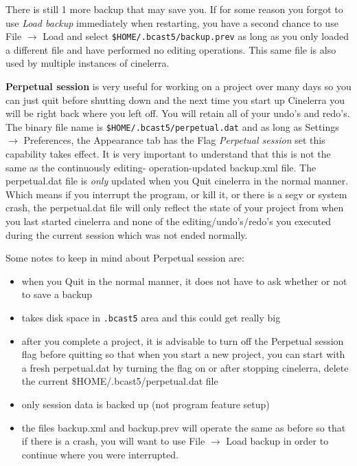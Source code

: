 There is still 1 more backup that may save you.  If for some reason you forgot to use \textit{Load backup} immediately when restarting, you have a second chance to use File $\rightarrow$ Load and select \texttt{\$HOME/.bcast5/backup.prev} as long as you only loaded a different file and have performed no editing operations.  This same file is also used by multiple instances of cinelerra.

\textbf{Perpetual session} is very useful for working on a project over many days so you can just quit before shutting down and the next time you start up Cinelerra you will be right back where you left off.  
You will retain all of your undo’s and redo’s.  
The binary file name is \texttt{\$HOME/.bcast5/perpetual.dat} and as long as Settings $\rightarrow$ Preferences, the Appearance tab has the Flag \textit{Perpetual session} set this capability takes effect.  
It is very important to understand that this is not the same as the continuously editing- operation-updated backup.xml file.  
The perpetual.dat file is \textit{only} updated when you Quit cinelerra in the normal manner.  
Which means if you interrupt the program, or kill it, or there is a segv or system crash, the perpetual.dat file will only reflect the state of your project from when you last started cinelerra and none of the editing/undo’s/redo’s you executed during the current session which was not ended normally.
\vspace{1ex}

Some notes to keep in mind about Perpetual session are:

\begin{itemize}
    \item when you Quit in the normal manner, it does not have to ask whether or not to save a backup
    \item takes disk space in \texttt{.bcast5} area and this could get really big
    \item after you complete a project, it is advisable to turn off the Perpetual session flag before quitting so
    that when you start a new project, you can start with a fresh perpetual.dat by turning the flag on or
    after stopping cinelerra, delete the current \$HOME/.bcast5/perpetual.dat file
    \item only session data is backed up (not program feature setup)
    \item the files backup.xml and backup.prev will operate the same as before so that if there is a crash, you
    will want to use File $\rightarrow$ Load backup in order to continue where you were interrupted.
\end{itemize}

